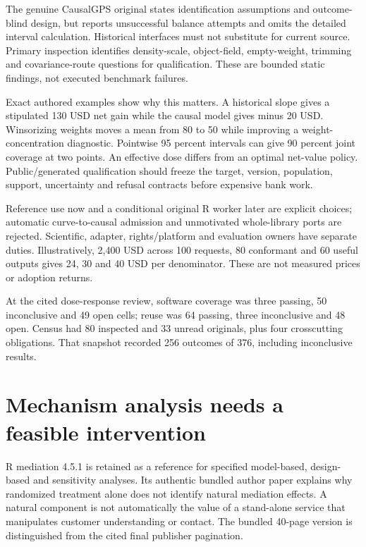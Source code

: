 The genuine CausalGPS original states identification assumptions and
outcome-blind design, but reports unsuccessful balance attempts and
omits the detailed interval calculation. Historical interfaces must not
substitute for current source. Primary inspection identifies
density-scale, object-field, empty-weight, trimming and covariance-route
questions for qualification. These are bounded static findings, not
executed benchmark failures.
\citep{exec24_dose_original,exec24_dose_causalgps,exec24_dose_weightit}

Exact authored examples show why this matters. A historical slope gives
a stipulated 130 USD net gain while the causal model gives minus 20 USD.
Winsorizing weights moves a mean from 80 to 50 while improving a
weight-concentration diagnostic. Pointwise 95 percent intervals can give
90 percent joint coverage at two points. An effective dose differs from
an optimal net-value policy. Public/generated qualification should
freeze the target, version, population, support, uncertainty and refusal
contracts before expensive bank work. \citep{exec24_dose_contract}

Reference use now and a conditional original R worker later are explicit
choices; automatic curve-to-causal admission and unmotivated
whole-library ports are rejected. Scientific, adapter, rights/platform
and evaluation owners have separate duties. Illustratively, 2,400 USD
across 100 requests, 80 conformant and 60 useful outputs gives 24, 30
and 40 USD per denominator. These are not measured prices or adoption
returns. \citep{exec24_dose_contract}

At the cited dose-response review, software coverage was three passing,
50 inconclusive and 49 open cells; reuse was 64 passing, three
inconclusive and 48 open. Census had 80 inspected and 33 unread
originals, plus four crosscutting obligations. That snapshot recorded
256 outcomes of 376, including inconclusive results.
\citep{sp24dose_reader,sp24dose_progress}

\hypertarget{mechanism-analysis-needs-a-feasible-intervention}{%
\section{Mechanism analysis needs a feasible
intervention}\label{mechanism-analysis-needs-a-feasible-intervention}}

R mediation 4.5.1 is retained as a reference for specified model-based,
design-based and sensitivity analyses. Its authentic bundled author
paper explains why randomized treatment alone does not identify natural
mediation effects. A natural component is not automatically the value of
a stand-alone service that manipulates customer understanding or
contact. The bundled 40-page version is distinguished from the cited
final publisher pagination.
\citep{exec24_mediation_sources,exec24_mediation_original}

